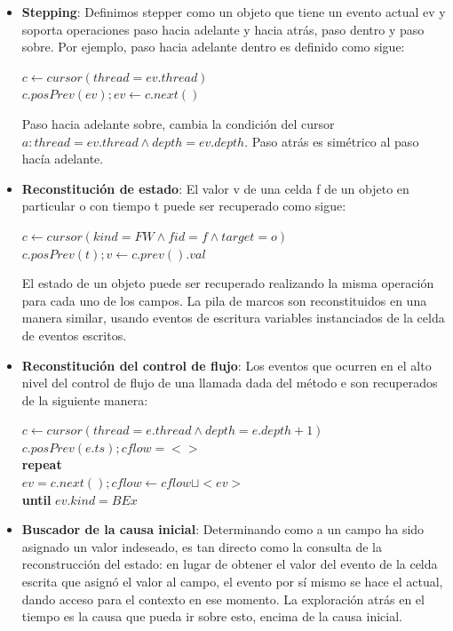 \documentclass[12pt,legalpaper]{report}
\begin{document}
\begin{itemize}
	\item \textbf{Stepping}: Definimos stepper como un objeto que tiene un evento actual ev y soporta operaciones paso hacia adelante y hacia atrás, paso dentro y paso sobre.  Por ejemplo, paso hacia adelante dentro es definido como sigue:

	$c \leftarrow cursor(thread = ev.thread)$\\
	$c.posPrev(ev); ev \leftarrow c.next()$

Paso hacia adelante sobre, cambia la condición del cursor $a: thread = ev.thread \wedge depth = ev.depth$.  Paso atrás es simétrico al paso hacía adelante.

	\item \textbf{Reconstitución de estado}: El valor v de una celda f de un objeto en particular o con tiempo t puede ser recuperado como sigue:

	$c \leftarrow cursor(kind = FW  \wedge fid = f \wedge target = o)$\\
	$c.posPrev(t); v \leftarrow c.prev().val$

El estado de un objeto puede ser recuperado realizando la misma operación para cada uno de los campos.  La pila de marcos son reconstituidos en una manera similar, usando eventos de escritura variables instanciados de la celda de eventos escritos.

	\item \textbf{Reconstitución del control de flujo}: Los eventos que ocurren en el alto nivel del control de flujo de una llamada dada del método e  son recuperados de la siguiente manera:

	$c \leftarrow cursor(thread = e.thread  \wedge depth = e.depth + 1)$\\
	$c.posPrev(e.ts); cflow = <>$\\
	\textbf{repeat}\\
	$	ev = c.next(); cflow \leftarrow cflow  \sqcup <ev>$\\
	\textbf{until} $ev.kind = BEx$\\

	\item \textbf{Buscador de la causa inicial}: Determinando como a un campo ha sido asignado un valor indeseado, es tan directo como la consulta de la reconstrucción del estado:  en lugar de obtener el valor del evento de la celda escrita que asignó el valor al campo, el evento por sí mismo se hace el actual, dando acceso para el contexto en ese momento.  La exploración atrás en el tiempo es la causa que pueda ir sobre esto, encima de la causa inicial.
	
\end{itemize}
\end{document}
